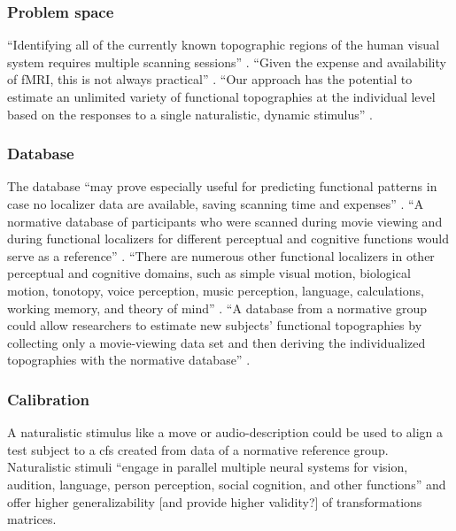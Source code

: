 \subsubsection{Problem space}

``Identifying all of the currently known topographic regions of the human visual
system requires multiple scanning sessions'' \citep{wang2015probabilistic}.
%
``Given the expense and availability of fMRI, this is not always practical''
\citep{wang2015probabilistic}.
%
``Our approach has the potential to estimate an unlimited variety of functional
topographies at the individual level based on the responses to a single
naturalistic, dynamic stimulus'' \citep{jiahui2020predicting}.



\subsubsection{Database}
%
The database ``may prove especially useful for predicting functional patterns in
case no localizer data are available, saving scanning time and expenses''
\citep{rosenke2021probabilistic}.
%
``A normative database of participants who were scanned during movie viewing and
during functional localizers for different perceptual and cognitive functions
would serve as a reference'' \citep{jiahui2020predicting}.
%
``There are numerous other functional localizers in other perceptual and
cognitive domains, such as simple visual motion, biological motion, tonotopy,
voice perception, music perception, language, calculations, working memory, and
theory of mind'' \citep{jiahui2020predicting}.
%
``A database from a normative group could allow researchers to estimate new
subjects' functional topographies by collecting only a movie-viewing data set
and then deriving the individualized topographies with the normative database''
\citep{jiahui2020predicting}.



\subsubsection{Calibration}
%
A naturalistic stimulus like a move or audio-description could be used to align
a test subject to a \ac{cfs} created from data of a normative reference group.
%
Naturalistic stimuli ``engage in parallel multiple neural systems for vision,
audition, language, person perception, social cognition, and other functions''
\citep{jiahui2020predicting} and offer higher generalizability [and provide
higher validity?] of transformations matrices.



